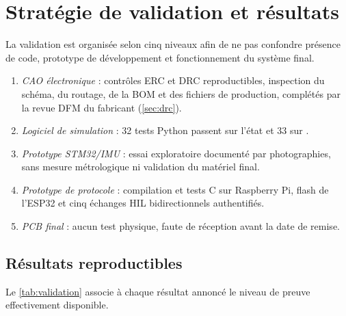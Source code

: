 \chapter{Stratégie de validation et résultats}
\label{chap:validation}

La validation est organisée selon cinq niveaux afin de ne pas confondre présence de code, prototype de développement et fonctionnement du système final.

\begin{enumerate}
  \item \emph{CAO électronique} : contrôles ERC et DRC reproductibles, inspection du schéma, du routage, de la BOM et des fichiers de production, complétés par la revue DFM du fabricant (\cref{sec:drc}).
  \item \emph{Logiciel de simulation} : 32 tests Python passent sur l'état  et 33 sur .
  \item \emph{Prototype STM32/IMU} : essai exploratoire documenté par photographies, sans mesure métrologique ni validation du matériel final.
  \item \emph{Prototype de protocole} : compilation et tests C sur Raspberry Pi, flash de l'ESP32 et cinq échanges HIL bidirectionnels authentifiés.
  \item \emph{PCB final} : aucun test physique, faute de réception avant la date de remise.
\end{enumerate}

\section{Résultats reproductibles}

Le \cref{tab:validation} associe à chaque résultat annoncé le niveau de preuve effectivement disponible.

